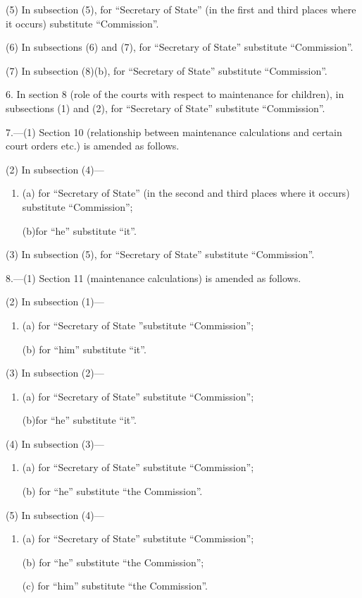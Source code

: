 \documentclass[a4paper]{article}
\begin{document}
(5) In subsection (5), for “Secretary of State” (in the first and third places where it occurs) substitute “Commission”.

(6) In subsections (6) and (7), for “Secretary of State” substitute “Commission”.

(7) In subsection (8)(b), for “Secretary of State” substitute “Commission”.

\medskip

6. In section 8 (role of the courts with respect to maintenance for children), in subsections (1) and (2), for “Secretary of State” substitute “Commission”.

\medskip

7.---(1) Section 10 (relationship between maintenance calculations and certain court orders etc.) is amended as follows.

(2) In subsection (4)—
\begin{enumerate}\item[]
(a) for “Secretary of State” (in the second and third places where it occurs) substitute “Commission”;

(b)for “he” substitute “it”.
\end{enumerate}

(3) In subsection (5), for “Secretary of State” substitute “Commission”.

\medskip

8.---(1) Section 11 (maintenance calculations) is amended as follows.

(2) In subsection (1)—
\begin{enumerate}\item[]
(a) for “Secretary of State ”substitute “Commission”;

(b) for “him” substitute “it”.
\end{enumerate}

(3) In subsection (2)—
\begin{enumerate}\item[]
(a) for “Secretary of State” substitute “Commission”;

(b)for “he” substitute “it”.
\end{enumerate}

(4) In subsection (3)—
\begin{enumerate}\item[]
(a) for “Secretary of State” substitute “Commission”;

(b) for “he” substitute “the Commission”.
\end{enumerate}

(5) In subsection (4)—
\begin{enumerate}\item[]
(a) for “Secretary of State” substitute “Commission”;

(b) for “he” substitute “the Commission”;

(c) for “him” substitute “the Commission”.
\end{enumerate}
\end{document}
